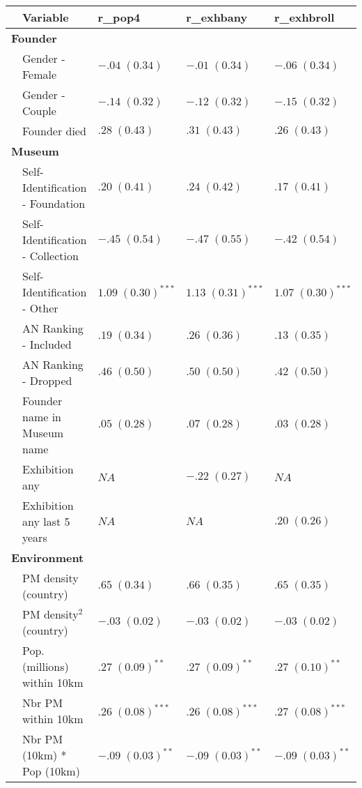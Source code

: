 \documentclass[12pt]{article}
\begin{document}
\begin{table}[ht]
\centering
\begin{tabular}{p{0mm}llll}
  \hline 
 \multicolumn{1}{l}{} & \multicolumn{1}{l}{Variable} & \multicolumn{1}{l}{r\_pop4} & \multicolumn{1}{l}{r\_exhbany} & \multicolumn{1}{l}{r\_exhbroll}\\ 
 \hline
  \multicolumn{5}{l}{\textbf{Founder}} \\ 
 & Gender - Female & $-.04 \; (0.34)$ & $-.01 \; (0.34)$ & $-.06 \; (0.34)$ \\ 
   & Gender - Couple & $-.14 \; (0.32)$ & $-.12 \; (0.32)$ & $-.15 \; (0.32)$ \\ 
   & Founder died & $.28 \; (0.43)$ & $.31 \; (0.43)$ & $.26 \; (0.43)$ \\ 
   \multicolumn{5}{l}{\textbf{Museum}} \\ 
 & Self-Identification - Foundation & $.20 \; (0.41)$ & $.24 \; (0.42)$ & $.17 \; (0.41)$ \\ 
   & Self-Identification - Collection & $-.45 \; (0.54)$ & $-.47 \; (0.55)$ & $-.42 \; (0.54)$ \\ 
   & Self-Identification - Other & $1.09 \; (0.30)^{***}$ & $1.13 \; (0.31)^{***}$ & $1.07 \; (0.30)^{***}$ \\ 
   & AN Ranking - Included & $.19 \; (0.34)$ & $.26 \; (0.36)$ & $.13 \; (0.35)$ \\ 
   & AN Ranking - Dropped & $.46 \; (0.50)$ & $.50 \; (0.50)$ & $.42 \; (0.50)$ \\ 
   & Founder name in Museum name & $.05 \; (0.28)$ & $.07 \; (0.28)$ & $.03 \; (0.28)$ \\ 
   & Exhibition any & $NA$ & $-.22 \; (0.27)$ & $NA$ \\ 
   & Exhibition any last 5 years & $NA$ & $NA$ & $.20 \; (0.26)$ \\ 
   \multicolumn{5}{l}{\textbf{Environment}} \\ 
 & PM density (country) & $.65 \; (0.34)$ & $.66 \; (0.35)$ & $.65 \; (0.35)$ \\ 
   & PM density$^{2}$ (country) & $-.03 \; (0.02)$ & $-.03 \; (0.02)$ & $-.03 \; (0.02)$ \\ 
   & Pop. (millions) within 10km & $.27 \; (0.09)^{**}$ & $.27 \; (0.09)^{**}$ & $.27 \; (0.10)^{**}$ \\ 
   & Nbr PM within 10km & $.26 \; (0.08)^{***}$ & $.26 \; (0.08)^{***}$ & $.27 \; (0.08)^{***}$ \\ 
   & Nbr PM (10km) * Pop (10km) & $-.09 \; (0.03)^{**}$ & $-.09 \; (0.03)^{**}$ & $-.09 \; (0.03)^{**}$ \\ 

\end{tabular}
\end{table}
\end{document}
